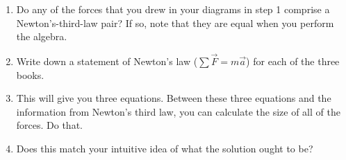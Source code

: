 \documentclass[12pt]{article}
\begin{document}
\begin{enumerate}
\begin{enumerate}
\item Do any of the forces that you drew in your diagrams in step 1 comprise
a Newton's-third-law pair? If so, note that they are equal when you perform the algebra.

\vspace{1in}

\item Write down a statement of Newton's law ($\sum \vec F = m \vec a$) for 
each of the three books.

\vspace{2in}

\item This will give you three equations. Between these three equations and the information from Newton's third law, you can calculate the size of all of the forces.
Do that.

\vspace{4in}

\item Does this match your intuitive idea of what the solution ought to be?
\vspace{2in}
\end{enumerate}
\end{enumerate}
\end{document}
